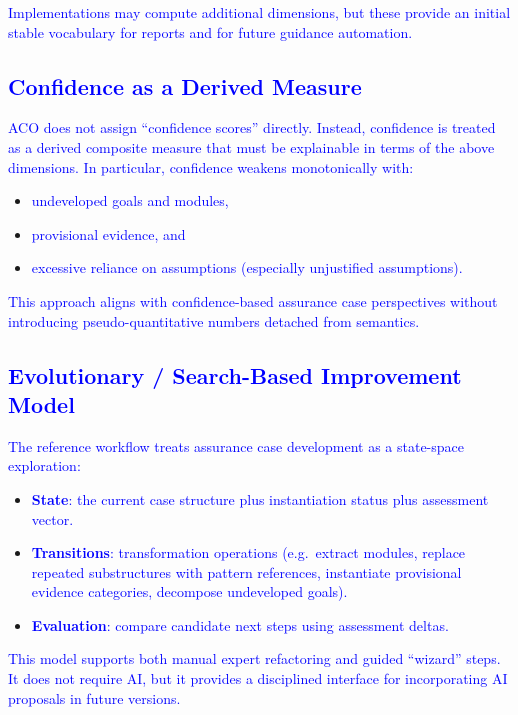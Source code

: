 \documentclass[11pt]{article}
\begin{document}
\textcolor{blue}{Implementations may compute additional dimensions, but these provide an initial stable vocabulary for reports and for future guidance automation.}

\subsection{\textcolor{blue}{Confidence as a Derived Measure}}

\textcolor{blue}{ACO does not assign ``confidence scores'' directly. Instead, confidence is treated as a derived composite measure that must be explainable in terms of the above dimensions. In particular, confidence weakens monotonically with:}
\begin{itemize}[leftmargin=2em]
  \item \textcolor{blue}{undeveloped goals and modules,}
  \item \textcolor{blue}{provisional evidence, and}
  \item \textcolor{blue}{excessive reliance on assumptions (especially unjustified assumptions).}
\end{itemize}

\textcolor{blue}{This approach aligns with confidence-based assurance case perspectives without introducing pseudo-quantitative numbers detached from semantics.}

\subsection{\textcolor{blue}{Evolutionary / Search-Based Improvement Model}}

\textcolor{blue}{The reference workflow treats assurance case development as a state-space exploration:}
\begin{itemize}[leftmargin=2em]
  \item \textcolor{blue}{\textbf{State}: the current case structure plus instantiation status plus assessment vector.}
  \item \textcolor{blue}{\textbf{Transitions}: transformation operations (e.g.\ extract modules, replace repeated substructures with pattern references, instantiate provisional evidence categories, decompose undeveloped goals).}
  \item \textcolor{blue}{\textbf{Evaluation}: compare candidate next steps using assessment deltas.}
\end{itemize}

\textcolor{blue}{This model supports both manual expert refactoring and guided ``wizard'' steps. It does not require AI, but it provides a disciplined interface for incorporating AI proposals in future versions.}
\end{document}
